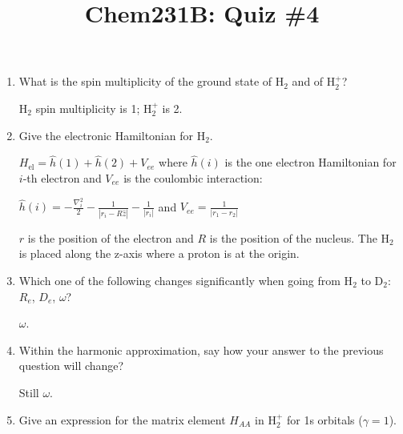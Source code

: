\documentclass{article}
\title{Chem231B: Quiz \#4} %
\begin{document}
\maketitle

\begin{enumerate}
\item What is the spin multiplicity of the ground state of H$_2$ and
  of H$_2^+$?

  {\color{blue} H$_2$ spin multiplicity is 1; H$_2^+$ is 2.}
  
\item Give the electronic Hamiltonian for H$_2$.

  {\color{blue} $H_{\text{el}} = \hat{h}(1) + \hat{h}(2) + V_{ee}$
    where $\hat{h}(i)$ is the one electron Hamiltonian for $i$-th electron
    and $V_{ee}$ is the coulombic interaction:
    
    $\hat{h}(i) = -\frac{\nabla_i^2}{2}-\frac{1}{|r_i - R\hat{z}|} -\frac{1}{|r_i|}$
    and $V_{ee} = \frac{1}{|r_1 - r_2|}$

    $r$ is the position of the electron and $R$ is the position of the
    nucleus. The H$_2$ is placed along the z-axis where a proton is at the origin.
  }
\item Which one of the following changes significantly when going from
  H$_2$ to D$_2$:  $R_e$, $D_e$, $\omega$?

  {\color{blue} $\omega$.}
\item Within the harmonic approximation, say how your answer to the previous
  question will change?

  {\color{blue} Still $\omega$.}
\item Give an expression for the matrix element $H_{AA}$ in H$_2^+$ for
  1s orbitals ($\gamma=1$).


\end{enumerate}
\end{document}
